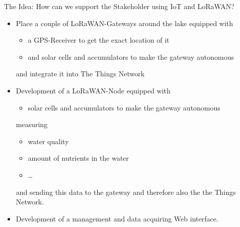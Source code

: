 \begin{frame}{The Idea: How can we support the Stakeholder using IoT and LoRaWAN?}
\begin{itemize}
    \item Place a couple of LoRaWAN-Gateways around the lake equipped with
    \begin{itemize}
        \item a GPS-Receiver to get the exact location of it
        \item and solar cells and accumulators to make the gateway autonomous
    \end{itemize}
    and integrate it into The Things Network
    \item Development of a LoRaWAN-Node equipped with
    \begin{itemize}
        \item solar cells and accumulators to make the gateway autonomous
    \end{itemize}
    measuring
    \begin{itemize}
        \item water quality
        \item amount of nutrients in the water
        \item \ldots
    \end{itemize}
    and sending this data to the gateway and therefore also the the Things Network.
    \item Development of a management and data acquiring Web interface.
\end{itemize}
\end{frame}
